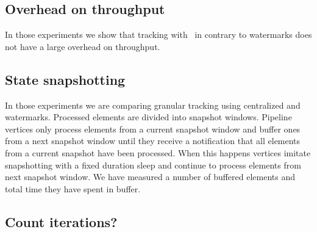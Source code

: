 \subsection{Overhead on throughput}

In those experiments we show that tracking with \tracker\ in contrary to watermarks does not have a large overhead on throughput.


\subsection{State snapshotting}

In those experiments we are comparing granular tracking using centralized \tracker and watermarks. Processed elements are divided into snapshot windows. Pipeline vertices only process elements from a current snapshot window and buffer ones from a next snapshot window until they receive a notification that all elements from a current snapshot have been processed. When this happens vertices imitate snapshotting with a fixed duration sleep and continue to process elements from next snapshot window. We have measured a number of buffered elements and total time they have spent in buffer.


\subsection{Count iterations?}

